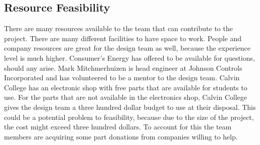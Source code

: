 \subsection{Resource Feasibility}
There are many resources available to the team that can contribute to the project. There are many different facilities to have space to work. People and company resources are great for the design team as well, because the experience level is much higher. Consumer's Energy has offered to be available for questions, should any arise. Mark Mitchmerhuizen is head engineer at Johnson Controls Incorporated and has volunteered to be a mentor to the design team. Calvin College has an electronic shop with free parts that are available for students to use. For the parts that are not available in the electronics shop, Calvin College gives the design team a three hundred dollar budget to use at their disposal. This could be a potential problem to feasibility, because due to the size of the project, the cost might exceed three hundred dollars. To account for this the team members are acquiring some part donations from companies willing to help.


